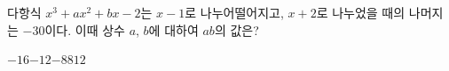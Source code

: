 다항식 $x^3+ax^2+bx-2$는 $x-1$로 나누어떨어지고, $x+2$로 나누었을 때의 나머지는 $-30$이다. 이때 상수 $a$, $b$에 대하여 $ab$의 값은?
\begin{choices32}{$-16$}{$-12$}{$-8$}{$8$}{$12$}\end{choices32}
